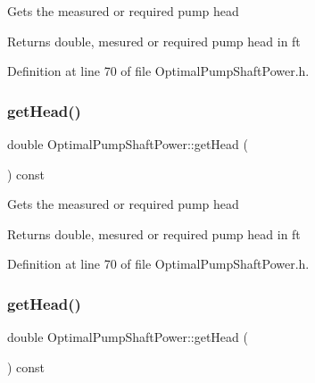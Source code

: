 Gets the measured or required pump head \begin{DoxyReturn}{Returns}
double, mesured or required pump head in ft 
\end{DoxyReturn}


Definition at line 70 of file Optimal\+Pump\+Shaft\+Power.\+h.

\mbox{\label{class_optimal_pump_shaft_power_abb285a8a256c10187113c34db1a4462b}} 
\subsubsection{\texorpdfstring{get\+Head()}{getHead()}\hspace{0.1cm}{\footnotesize\ttfamily [2/3]}}
{\footnotesize\ttfamily double Optimal\+Pump\+Shaft\+Power\+::get\+Head (\begin{DoxyParamCaption}{ }\end{DoxyParamCaption}) const\hspace{0.3cm}{\ttfamily [inline]}}

Gets the measured or required pump head \begin{DoxyReturn}{Returns}
double, mesured or required pump head in ft 
\end{DoxyReturn}


Definition at line 70 of file Optimal\+Pump\+Shaft\+Power.\+h.

\mbox{\label{class_optimal_pump_shaft_power_abb285a8a256c10187113c34db1a4462b}} 
\subsubsection{\texorpdfstring{get\+Head()}{getHead()}\hspace{0.1cm}{\footnotesize\ttfamily [3/3]}}
{\footnotesize\ttfamily double Optimal\+Pump\+Shaft\+Power\+::get\+Head (\begin{DoxyParamCaption}{ }\end{DoxyParamCaption}) const\hspace{0.3cm}{\ttfamily [inline]}}


